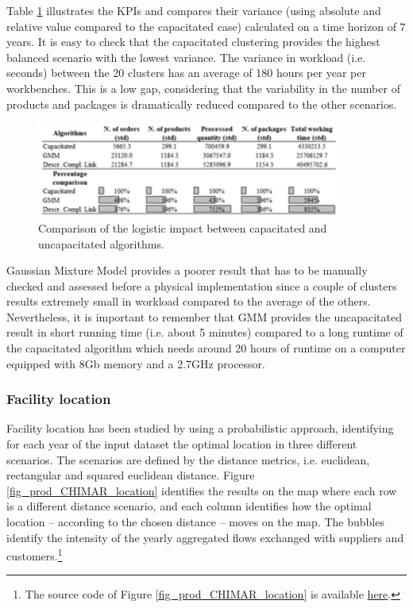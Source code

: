 Table \ref{tab_prod_CHIMAR_familiesPerformance} illustrates the KPIs and compares their variance (using absolute and relative value compared to the capacitated case) calculated on a time horizon of 7 years. It is easy to check that the capacitated clustering provides the highest balanced scenario with the lowest variance. The variance in workload (i.e. seconds) between the 20 clusters has an average of 180 hours per year per workbenches. This is a low gap, considering that the variability in the number of products and packages is dramatically reduced compared to the other scenarios.

\begin{figure}[hbt!]
\centering
\includegraphics[width=0.9\textwidth]{sectionProduction/design_plant_figures/tab_prod_CHIMAR_familiesPerformance.png}
\captionsetup{type=table}
\caption{Comparison of the logistic impact between capacitated and uncapacitated algorithms.}
\label{tab_prod_CHIMAR_familiesPerformance}
\end{figure}

Gaussian Mixture Model provides a poorer result that has to be manually checked and assessed before a physical implementation since a couple of clusters results extremely small in workload compared to the average of the others. Nevertheless, it is important to remember that GMM provides the uncapacitated result in short running time (i.e. about 5 minutes) compared to a long runtime of the capacitated algorithm which needs around 20 hours of runtime on a computer equipped with 8Gb memory and a 2.7GHz processor. 

\subsubsection{Facility location}
Facility location has been studied by using a probabilistic approach, identifying for each year of the input dataset the optimal location in three different scenarios. The scenarios are defined by the distance metrics, i.e. euclidean, rectangular and squared euclidean distance. Figure \ref{fig_prod_CHIMAR_location} identifies the results on the map where each row is a different distance scenario, and each column identifies how the optimal location – according to the chosen distance – moves on the map. The bubbles identify the intensity of the yearly aggregated flows exchanged with suppliers and customers.\footnote{The source code of Figure \ref{fig_prod_CHIMAR_location} is available \href{https://github.com/aletuf93/logproj/blob/master/examples/PROD_01\%20Facility\%20location.ipynb}{here}.}

